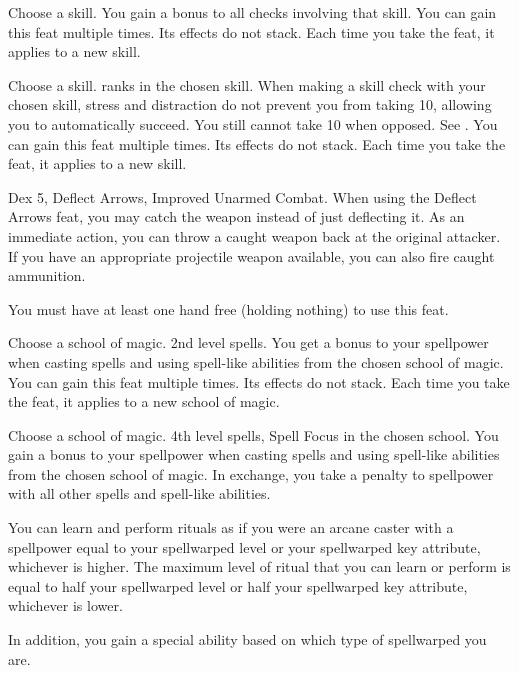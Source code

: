 Choose a skill.
\featben You gain a  bonus to all checks involving that skill.
You can gain this feat multiple times.
Its effects do not stack.
Each time you take the feat, it applies to a new skill.

Choose a skill.
 ranks in the chosen skill.
\featben When making a skill check with your chosen skill, stress and distraction do not prevent you from taking 10, allowing you to automatically succeed.
You still cannot take 10 when opposed.
See .
You can gain this feat multiple times.
Its effects do not stack.
Each time you take the feat, it applies to a new skill.

\featpres
Dex 5, Deflect Arrows, Improved Unarmed Combat.
\featben When using the Deflect Arrows feat, you may catch the weapon instead of just deflecting it.
As an immediate action, you can throw a caught weapon back at the original attacker.
If you have an appropriate projectile weapon available, you can also fire caught ammunition.
\par You must have at least one hand free (holding nothing) to use this feat.

Choose a school of magic.
\featpre 2nd level spells.
\featben You get a  bonus to your spellpower when casting spells and using spell-like abilities from the chosen school of magic.
You can gain this feat multiple times.
Its effects do not stack.
Each time you take the feat, it applies to a new school of magic.

Choose a school of magic.
\featpres 4th level spells, Spell Focus in the chosen school.
\featben You gain a  bonus to your spellpower when casting spells and using spell-like abilities from the chosen school of magic.
In exchange, you take a  penalty to spellpower with all other spells and spell-like abilities.

\featben You can learn and perform rituals as if you were an arcane caster with a spellpower equal to your spellwarped level or your spellwarped key attribute, whichever is higher.
The maximum level of ritual that you can learn or perform is equal to half your spellwarped level or half your spellwarped key attribute, whichever is lower.

In addition, you gain a special ability based on which type of spellwarped you are.

